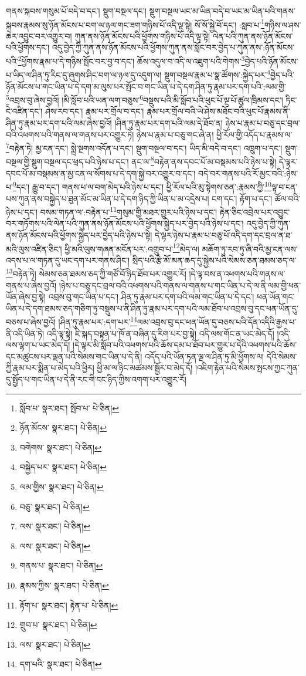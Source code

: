 གནས་སྐབས་གསུམ་པོ་བདེ་བ་དང་། སྡུག་བསྔལ་དང་། སྡུག་བསྔལ་ཡང་མ་ཡིན་བདེ་བ་ཡང་མ་ཡིན་པའི་གནས་སྐབས་རྣམས་སུ་ཉོན་མོངས་པ་བག་ལ་ཉལ་གང་ཟག་གཉིས་པོ་འདི་ལྟ་སྟེ། སོ་སོ་སྐྱེ་བོ་དང་། :སླབ་པ་\footnote{སློབ་པ་  སྣར་ཐང་། སྤོབ་པ་  པེ་ཅིན། }གཉིས་ལ་ཤས་ཆེར་འབྱུང་བར་འགྱུར་བ། ཀུན་ནས་ཉོན་མོངས་པའི་ཕྱོགས་གཉིས་པོ་འདི་ལྟ་སྟེ། ལེན་པའི་ཀུན་ནས་ཉོན་མོངས་པའི་ཕྱོགས་དང་། འདུ་བྱེད་ཀྱི་ཀུན་ནས་ཉོན་མོངས་པའི་ཕྱོགས་ཀུན་ནས་སློང་བར་བྱེད་པ་ཀུན་ནས་:ཉོན་མོངས་པའི་\footnote{ཉོན་མོངས་  སྣར་ཐང་།  པེ་ཅིན། }ཕྱོགས་རྣམ་པ་དེ་གཉིས་སྤོང་བར་བྱ་བ་དང་། ཆོས་འདུལ་བ་འདི་ལ་འཇུག་པའི་གེགས་\footnote{བགེགས་  སྣར་ཐང་།  པེ་ཅིན། }བྱེད་པའི་ཉོན་མོངས་པ་ཡིད་ལ་ཤིན་ཏུ་རིང་དུ་ཞུགས་ཤིང་བག་ལ་ཉལ་དུ་འདུག་ལ། སྡུག་བསྔལ་རྣམ་པ་སྣ་ཚོགས་:སྐྱེད་པར་\footnote{བསྐྱེད་པར་  སྣར་ཐང་།  པེ་ཅིན། }བྱེད་པའི་ཉོན་མོངས་པ་གང་ཡིན་པ་དེ་དག་མ་ལུས་པར་སྤོང་བ་གང་ཡིན་པ་དེ་དག་ཤིན་ཏུ་རྣམ་པར་དག་པའི་:ལམ་གྱི་\footnote{ལམ་གྱིས་  སྣར་ཐང་།  པེ་ཅིན། }འབྲས་བུ་ཞེས་བྱའོ། །མི་སློབ་པའི་ཡན་ལག་བཅུས་\footnote{བཅུ་  སྣར་ཐང་།  པེ་ཅིན། }བསྡུས་པའི་མི་སློབ་པའི་ཕུང་པོ་ལྔ་པོ་ཚུལ་ཁྲིམས་དང་། ཏིང་ངེ་འཛིན་དང་། ཤེས་རབ་དང་། རྣམ་པར་གྲོལ་བ་དང་། རྣམ་པར་གྲོལ་བའི་ཡེ་ཤེས་མཐོང་བའི་ཕུང་པོ་རྣམས་ནི་ཤིན་ཏུ་རྣམ་པར་དག་པའི་ལམ་ཞེས་བྱའོ། །ཤིན་ཏུ་རྣམ་པར་དག་པའི་ལམ་དེ་ཐོབ་ན། ཉེས་པ་རྣམ་པ་བཅུ་དང་བྲལ་བའི་འཕགས་པའི་གནས་ལ་གནས་པར་འགྱུར་ཏེ། ཉེས་པ་རྣམ་པ་བཅུ་གང་ཞེ་ན། ཕྱི་རོལ་གྱི་འདོད་པ་རྣམས་ལ་\footnote{ལས་  སྣར་ཐང་།  པེ་ཅིན། }བརྟེན་ཏེ། མྱ་ངན་དང་། སྨྲེ་སྔགས་འདོན་པ་དང་། སྡུག་བསྔལ་བ་དང་། ཡིད་མི་བདེ་བ་དང་། འཁྲུག་པ་དང་། སྡུག་བསྔལ་གྱི་སྡུག་བསྔལ་དང་ཕྲད་པའི་ཉེས་པ་དང་། ནང་ལ་\footnote{ལས་  སྣར་ཐང་།  པེ་ཅིན། }བརྟེན་ནས་དབང་པོ་མ་བསྡམས་པའི་ཉེས་པ་སྟེ། དེ་ལྟར་དབང་པོ་མ་བསྡམས་ན་མྱ་ངན་ལ་སོགས་པ་དེ་དག་སྐྱེ་བར་འགྱུར་བ་དང་། བདེ་བར་གནས་པའི་རོ་མྱང་བའི་:ཉེས་པ་\footnote{གནས་པ་  སྣར་ཐང་།  པེ་ཅིན། }དང་། རྒྱུ་བ་དང་། གནས་པ་ལ་བག་མེད་པའི་ཉེས་པ་དང་། ཕྱི་རོལ་པའི་མུ་སྟེགས་ཅན་:རྣམས་ཀྱི་\footnote{རྣམས་ཀྱིས་  སྣར་ཐང་།  པེ་ཅིན། }ལྟ་བ་ངན་པས་ཀུན་ནས་བསྐྱེད་པ་ཐུན་མོང་མ་ཡིན་པ་དེ་དག་ཉིད་ཀྱི་ཡིན་པ་མ་འདྲེས་པ། ངག་དང་། རྟོག་པ་དང་། ཚོལ་བའི་ཉེས་པ་དང་། བསམ་གཏན་ལ་:བརྟེན་པ་\footnote{རྟོག་པ་  སྣར་ཐང་། རྟེན་པ་  པེ་ཅིན། }གསུམ་གྱི་མཐར་གྱུར་པའི་ཉེས་པ་དང་། རྟེན་ཅིང་འབྲེལ་པར་འབྱུང་བར་གཏོགས་པའི་ལེན་པའི་ཀུན་ནས་ཉོན་མོངས་པའི་ཕྱོགས་སྐྱེད་པར་བྱེད་པའི་ཉེས་པ་དང་། འདུ་བྱེད་ཀྱི་ཀུན་ནས་ཉོན་མོངས་པའི་ཕྱོགས་སྐྱེད་པར་བྱེད་པའི་ཉེས་པ་སྟེ། དེ་ལྟར་ཉེས་པ་རྣམ་པ་བཅུ་པོ་འདི་དག་དང་བྲལ་ན་ཐ་མའི་ལུས་འཛིན་ཅིང་། ཕྱི་མའི་ལུས་གཞན་མངོན་པར་:འགྲུབ་པ་\footnote{གྲུབ་པ་  སྣར་ཐང་།  པེ་ཅིན། }མེད་ལ། མཆོག་ཏུ་རབ་ཏུ་ཞི་བའི་མྱ་ངན་ལས་འདས་པ་ལ་གཏན་དུ་ཡང་དག་པར་གནས་ཤིང་། སྲིད་པའི་རྩེ་མོ་མན་ཆད་དུ་སྐྱེས་པའི་སེམས་ཅན་ཐམས་ཅད་ལ་\footnote{ལས་  སྣར་ཐང་།  པེ་ཅིན། }བརྟེན་ཏེ། སེམས་ཅན་ཐམས་ཅད་ཀྱི་གཙོ་བོ་ཉིད་ཐོབ་པར་འགྱུར་རོ། །དེ་ལྟ་བས་ན་འཕགས་པའི་གནས་ལ་གནས་པ་ཞེས་བྱའོ། །ཉེས་པ་བཅུ་དང་བྲལ་བའི་འཕགས་པའི་གནས་ལ་གནས་པ་གང་ཡིན་པ་དེ་ལ་ནི་ལམ་གྱི་ཕན་ཡོན་ཞེས་བྱ་སྟེ། འབྲས་བུ་གང་ཡིན་པ་དང་། ཤིན་ཏུ་རྣམ་པར་དག་པའི་ལམ་གང་ཡིན་པ་དེ་དང་། ཕན་ཡོན་གང་ཡིན་པ་དེ་དག་ཐམས་ཅད་གཅིག་ཏུ་བསྡུས་པ་ནི་ཤིན་ཏུ་རྣམ་པར་དག་པའི་ལམ་ཐོབ་པ་འབྲས་བུ་དང་ཕན་ཡོན་དུ་བཅས་པ་ཞེས་བྱའོ། །ཤིན་ཏུ་རྣམ་པར་:དག་པར་\footnote{དག་པའི་  སྣར་ཐང་།  པེ་ཅིན། }ལམ་འབྲས་བུ་དང་ཕན་ཡོན་དུ་བཅས་པའི་དོན་འདིའི་རྒྱས་པ་ནི་འདི་ཡིན་ཏེ། འདི་ལྟ་སྟེ། ཇི་སྐད་བསྟན་པ་ཁོ་ན་བཞིན་དུ་རིག་པར་བྱ་སྟེ། འདི་ལས་གོང་ན་ཡང་མེད་དོ། །འདི་ལས་ལྷག་པ་ཡང་མེད་དོ། །དེ་ལྟར་མི་སློབ་པའི་འཕགས་པའི་ཆོས་དམ་པ་ཐོབ་པར་གྱུར་པ་དེའི་འཕགས་པའི་ཆོས་དང་མཚུངས་པར་ལྡན་པའི་སེམས་གང་ཡིན་པ་དེ་ནི། འདོད་པའི་ཡོན་ཏན་ལྔ་ལ་ཤིན་ཏུ་མི་ཕྱོགས་ལ། དེའི་སེམས་ཀྱི་རྣམ་པར་སྨིན་པ་མེད་པའི་ཕྱིར། ཕྱི་མ་ལ་ཉིང་མཚམས་སྦྱོར་བ་མེད་དོ། །འཇིག་རྟེན་པའི་སེམས་སྤངས་ཀྱང་ཀུན་དུ་སྤྱོད་པ་གང་ཡིན་པ་དེ་ནི་རང་གི་ངང་ཉིད་ཀྱིས་འགག་པར་འགྱུར་རོ། 
